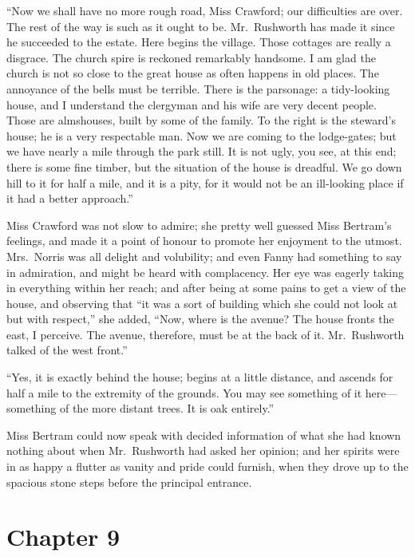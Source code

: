 ``Now we shall have no more rough road, Miss Crawford;
our difficulties are over.  The rest of the way is such
as it ought to be.  Mr.\ Rushworth has made it since he
succeeded to the estate.  Here begins the village.
Those cottages are really a disgrace.  The church spire
is reckoned remarkably handsome.  I am glad the church
is not so close to the great house as often happens in
old places.  The annoyance of the bells must be terrible.
There is the parsonage:  a tidy-looking house, and I
understand the clergyman and his wife are very decent people.
Those are almshouses, built by some of the family.
To the right is the steward's house; he is a very
respectable man.  Now we are coming to the lodge-gates;
but we have nearly a mile through the park still.
It is not ugly, you see, at this end; there is some
fine timber, but the situation of the house is dreadful.
We go down hill to it for half a mile, and it is a pity,
for it would not be an ill-looking place if it had a
better approach.''

Miss Crawford was not slow to admire; she pretty well guessed
Miss Bertram's feelings, and made it a point of honour
to promote her enjoyment to the utmost.  Mrs.\ Norris was
all delight and volubility; and even Fanny had something
to say in admiration, and might be heard with complacency.
Her eye was eagerly taking in everything within her reach;
and after being at some pains to get a view of the house,
and observing that ``it was a sort of building which she
could not look at but with respect,'' she added, ``Now, where
is the avenue?  The house fronts the east, I perceive.
The avenue, therefore, must be at the back of it.
Mr.\ Rushworth talked of the west front.''

``Yes, it is exactly behind the house; begins at a little
distance, and ascends for half a mile to the extremity
of the grounds.  You may see something of it here---%
something of the more distant trees.  It is oak entirely.''

Miss Bertram could now speak with decided information
of what she had known nothing about when Mr.\ Rushworth
had asked her opinion; and her spirits were in as happy
a flutter as vanity and pride could furnish, when they drove
up to the spacious stone steps before the principal entrance.



\chapter{Chapter 9}

